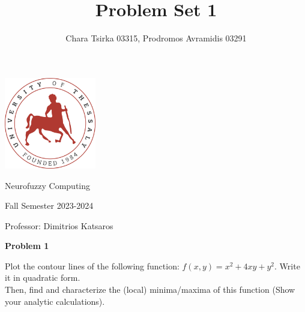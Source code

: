 \documentclass{article}
\title{\Huge Problem Set 1}
\author {\Large Chara Tsirka 03315, Prodromos Avramidis 03291}
\begin{document}
\maketitle
\begin{center}
\vspace{1cm}
\includegraphics[width=0.3\textwidth]{uthlogo.png}
\vspace{2cm}
\end{center}
\begin{center}
  \Huge Neurofuzzy Computing \vspace{1cm}

  \Large Fall Semester 2023-2024 \vspace{1cm}

  \Large Professor: Dimitrios Katsaros
\end{center}


\newpage
\noindent \textbf{Problem 1}

\noindent Plot the contour lines of the following function: $f(x,y) = x^2+4xy+y^2$. Write it in quadratic form.\\ Then, find and characterize the (local) minima/maxima of this function (Show your analytic calculations).
\\ \\ \\
\end{document}
